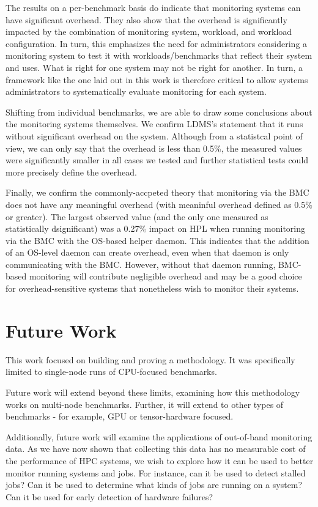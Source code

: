 \documentclass[conference]{IEEEtran}
\begin{document}
The results on a per-benchmark basis do indicate that monitoring systems can 
have significant overhead. They also show that the overhead is significantly 
impacted by the combination of monitoring system, workload, and workload 
configuration. In turn, this emphasizes the need for administrators considering 
a monitoring system to test it with workloads/benchmarks that reflect their 
system and uses. What is right for one system may not be right for another. 
In turn, a framework like the one laid out in this work is therefore critical 
to allow systems administrators to systematically evaluate monitoring for each 
system.

Shifting from individual benchmarks, we are able to draw some conclusions about 
the monitoring systems themselves. We confirm LDMS's statement that it runs without significant 
overhead on the system. Although from a 
statistcal point of view, we can only say that the overhead is less than 0.5\%,
the measured values were significantly smaller in all cases we tested and further statistical 
tests could more precisely define the overhead.

Finally, we confirm the commonly-accpeted theory that monitoring via the BMC 
does not have any meaningful overhead (with meaninful overhead defined as 
0.5\% or greater). The largest observed value (and the only one measured as 
statistically dsignificant) was a 0.27\% impact on HPL when 
running monitoring via the BMC with the OS-based helper daemon. This indicates 
that the addition of an OS-level daemon can create overhead, even when that daemon is 
only communicating with the BMC. However, without that daemon running, BMC-based 
monitoring will contribute negligible overhead and may be a good choice for 
overhead-sensitive systems that nonetheless wish to monitor their systems.

\section{Future Work} \label{futurework}

This work focused on building and proving a methodology. It was 
specifically limited to single-node runs of CPU-focused benchmarks.

Future work will extend beyond these limits, examining how this methodology 
works on multi-node benchmarks. Further, it will extend to
other types of benchmarks - for example, GPU or tensor-hardware focused.

Additionally, future work will examine the applications of
out-of-band monitoring data. As we have now shown that collecting this data has 
no measurable cost of the performance of HPC systems, we wish to explore how
it can be used to better monitor running systems and jobs. For instance, can it 
be used to detect stalled jobs? Can it be used to determine what kinds of jobs
are running on a system? Can it be used for early detection of hardware 
failures?
\end{document}
